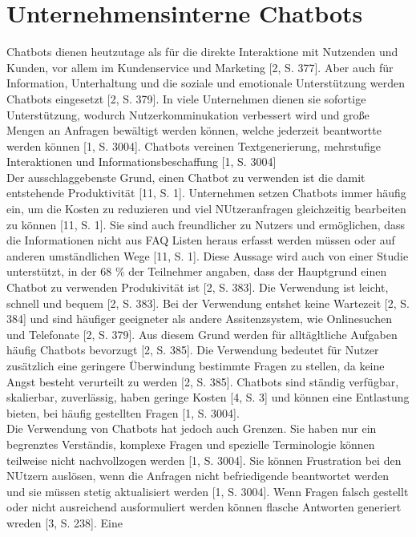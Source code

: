 \section{Unternehmensinterne Chatbots}

Chatbots dienen heutzutage als für die direkte Interaktione mit Nutzenden und Kunden, vor allem im Kundenservice und Marketing [2, S. 377]. Aber auch für Information,
Unterhaltung und die soziale und emotionale Unterstützung werden Chatbots eingesetzt [2, S. 379]. In viele Unternehmen dienen sie sofortige Unterstützung, wodurch
Nutzerkomminukation verbessert wird und große Mengen an Anfragen bewältigt werden können, welche jederzeit beantwortte werden können [1, S. 3004]. Chatbots vereinen 
Textgenerierung, mehrstufige Interaktionen und Informationsbeschaffung [1, S. 3004] \\
Der ausschlaggebenste Grund, einen Chatbot zu verwenden ist die damit entstehende Produktivität [11, S. 1]. Unternehmen setzen Chatbots immer häufig ein, um die Kosten
zu reduzieren und viel NUtzeranfragen gleichzeitig bearbeiten zu können [11, S. 1]. Sie sind auch freundlicher zu Nutzers und ermöglichen, dass die Informationen
nicht aus FAQ Listen heraus erfasst werden müssen oder auf anderen umständlichen Wege [11, S. 1]. Diese Aussage wird auch von einer Studie unterstützt, in der 
68 \% der Teilnehmer angaben, dass der Hauptgrund einen Chatbot zu verwenden Produkivität ist [2, S. 383]. Die Verwendung ist leicht, schnell und bequem [2, S. 383].
Bei der Verwendung entshet keine Wartezeit [2, S. 384] und sind häufiger geeigneter als andere Assitenzsystem, wie Onlinesuchen und Telefonate [2, S. 379]. Aus diesem
Grund werden für alltägltliche Aufgaben häufig Chatbots bevorzugt [2, S. 385]. Die Verwendung bedeutet für Nutzer zusätzlich eine geringere Überwindung bestimmte 
Fragen zu stellen, da keine Angst besteht verurteilt zu werden [2, S. 385]. Chatbots sind ständig verfügbar, skalierbar, zuverlässig, haben geringe Kosten [4, S. 3] und
können eine Entlastung bieten, bei häufig gestellten Fragen [1, S. 3004]. \\
Die Verwendung von Chatbots hat jedoch auch Grenzen. Sie haben nur ein begrenztes Verständis, komplexe Fragen und spezielle Terminologie können teilweise nicht
nachvollzogen werden [1, S. 3004]. Sie können Frustration bei den NUtzern auslösen, wenn die Anfragen nicht befriedigende beantwortet werden und sie müssen stetig 
aktualisiert werden [1, S. 3004]. Wenn Fragen falsch gestellt oder nicht ausreichend ausformuliert werden können flasche Antworten generiert wreden [3, S. 238]. Eine 
